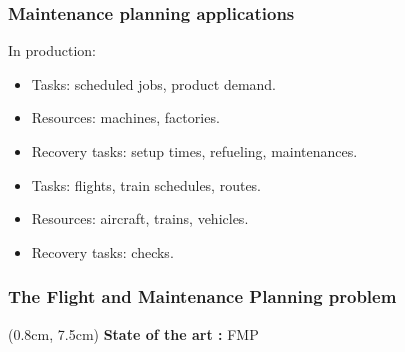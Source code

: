 \begin{frame}
\frametitle{\textbf{Maintenance planning applications}}

  In production:
  \begin{itemize}[<+->]
    \item Tasks: scheduled jobs, product demand.
    \item Resources: machines, factories.
    \item Recovery tasks: setup times, refueling, maintenances.
  \end{itemize}  
  \pause
  \begin{itemize}[<+->]
    \item Tasks: flights, train schedules, routes.
    \item Resources: aircraft, trains, vehicles.
    \item Recovery tasks: checks.
  \end{itemize}

\end{frame}

\begin{frame}[t]
\frametitle{\textbf{The Flight and Maintenance Planning problem}}
  
  \begin{adjustbox}{max totalsize={\textwidth}{.5\textheight},center}
  \begin{tikzpicture}
     
  \end{tikzpicture}
  \end{adjustbox}

  \begin{textblock*}{1.1\textwidth}(0.8cm, 7.5cm)
    \textbf{State of the art :} FMP
    \begin{flushleft}
    \end{flushleft}
  \end{textblock*}
\end{frame}

